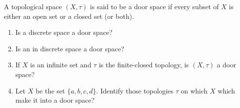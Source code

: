 \begin{exercise}
    A topological space $(X, \tau)$ is said to be a {\color{red}door space} if every subset of $X$ is either an open set or a closed set (or both).
    \begin{enumerate}[label={(\roman*)}]
        \item Is a discrete space a door space?
        \item Is an in discrete space a door space?
        \item If $X$ is an infinite set and $\tau$ is the finite-closed topology, is $(X, \tau)$ a door space?
        \item Let $X$ be the set $\{ a, b, c, d \}$. Identify those topologies $\tau$ on which $X$ which make it into a door space?
    \end{enumerate}
\end{exercise}

